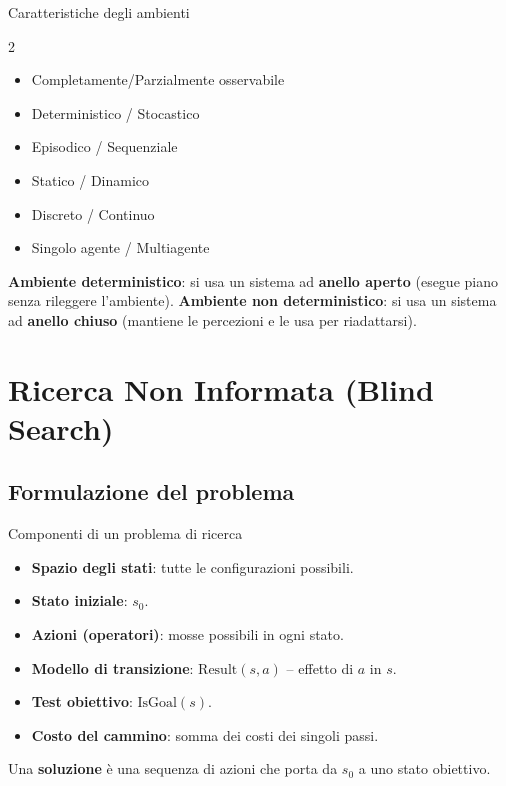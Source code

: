 \documentclass[12pt,a4paper]{article}
\begin{document}
\begin{defbox}{Caratteristiche degli ambienti}
\begin{multicols}{2}
\begin{itemize}[noitemsep]
  \item Completamente/Parzialmente osservabile
  \item Deterministico / Stocastico
  \item Episodico / Sequenziale
  \item Statico / Dinamico
  \item Discreto / Continuo
  \item Singolo agente / Multiagente
\end{itemize}
\end{multicols}
\textbf{Ambiente deterministico}: si usa un sistema ad \textbf{anello aperto} (esegue piano senza rileggere l'ambiente). \textbf{Ambiente non deterministico}: si usa un sistema ad \textbf{anello chiuso} (mantiene le percezioni e le usa per riadattarsi).
\end{defbox}

\section{Ricerca Non Informata (Blind Search)}

\subsection{Formulazione del problema}

\begin{defbox}{Componenti di un problema di ricerca}
\begin{itemize}[noitemsep]
  \item \textbf{Spazio degli stati}: tutte le configurazioni possibili.
  \item \textbf{Stato iniziale}: $s_0$.
  \item \textbf{Azioni (operatori)}: mosse possibili in ogni stato.
  \item \textbf{Modello di transizione}: $\text{Result}(s, a)$ -- effetto di $a$ in $s$.
  \item \textbf{Test obiettivo}: $\text{IsGoal}(s)$.
  \item \textbf{Costo del cammino}: somma dei costi dei singoli passi.
\end{itemize}
Una \textbf{soluzione} è una sequenza di azioni che porta da $s_0$ a uno stato obiettivo.
\end{defbox}
\end{document}

